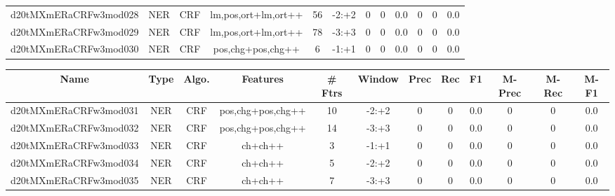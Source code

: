 \documentclass[a4paper]{article}
\begin{document}
\begin{landscape}
\begin{center}
\begin{tabular}{ |c|c|c|c|c|c|c|c|c|c|c|c|}
 
 	
 	\small{ d20tMXmERaCRFw3mod028 } & \small{ NER} & \small{  CRF }  & lm,pos,ort+lm,ort++  &  56 &  \small{  -2:+2 }  &  0 & 0 & 0.0  &  0 & 0 & 0.0 \\
 	

 
 	
 	\small{ d20tMXmERaCRFw3mod029 } & \small{ NER} & \small{  CRF }  & lm,pos,ort+lm,ort++  &  78 &  \small{  -3:+3 }  &  0 & 0 & 0.0  &  0 & 0 & 0.0 \\
 	

 
 	
 	\small{ d20tMXmERaCRFw3mod030 } & \small{ NER} & \small{  CRF }  & pos,chg+pos,chg++  &  6 &  \small{  -1:+1 }  &  0 & 0 & 0.0  &  0 & 0 & 0.0 \\
 	
 \hline
\end{tabular}
\end{center}




\begin{center}
\begin{tabular}{ |c|c|c|c|c|c|c|c|c|c|c|c|} 
 \hline
 	Name & Type & Algo. & Features & \# Ftrs & Window & Prec & Rec & F1 & M-Prec & M-Rec & M-F1\\
 \hline

 	

 
 	
 	\small{ d20tMXmERaCRFw3mod031 } & \small{ NER} & \small{  CRF }  & pos,chg+pos,chg++  &  10 &  \small{  -2:+2 }  &  0 & 0 & 0.0  &  0 & 0 & 0.0 \\
 	

 
 	
 	\small{ d20tMXmERaCRFw3mod032 } & \small{ NER} & \small{  CRF }  & pos,chg+pos,chg++  &  14 &  \small{  -3:+3 }  &  0 & 0 & 0.0  &  0 & 0 & 0.0 \\
 	

 
 	
 	\small{ d20tMXmERaCRFw3mod033 } & \small{ NER} & \small{  CRF }  & ch+ch++  &  3 &  \small{  -1:+1 }  &  0 & 0 & 0.0  &  0 & 0 & 0.0 \\
 	

 
 	
 	\small{ d20tMXmERaCRFw3mod034 } & \small{ NER} & \small{  CRF }  & ch+ch++  &  5 &  \small{  -2:+2 }  &  0 & 0 & 0.0  &  0 & 0 & 0.0 \\
 	

 
 	
 	\small{ d20tMXmERaCRFw3mod035 } & \small{ NER} & \small{  CRF }  & ch+ch++  &  7 &  \small{  -3:+3 }  &  0 & 0 & 0.0  &  0 & 0 & 0.0 \\
 	


\end{tabular}
\end{center}
\end{landscape}
\end{document}
